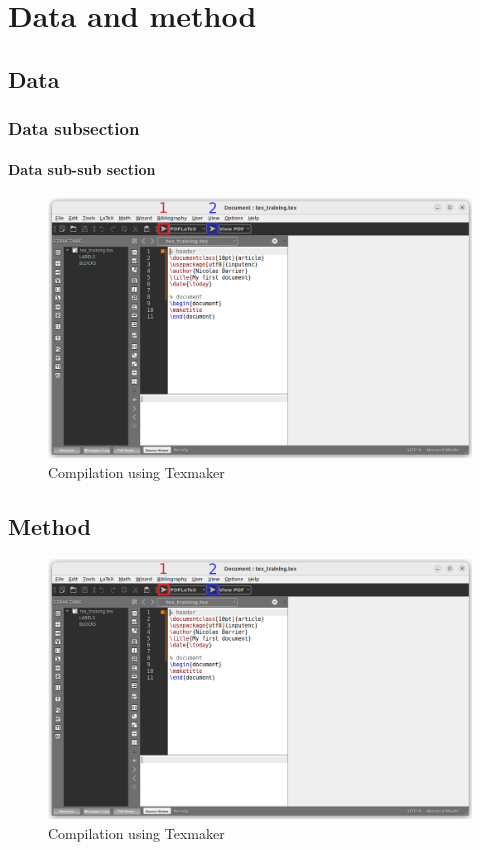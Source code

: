 \chapter{Data and method}
\label{chap:data-method}
\minitoc

\section{Data}
\subsection{Data subsection}
\subsubsection{Data sub-sub section}
\lipsum[1-3]

\begin{figure}[h!]
    \centering
    \includegraphics[width=0.5\linewidth]{figs/texmaker-1.png}
    \caption{Compilation using Texmaker}
\end{figure}

\lipsum[4-7]

\section{Method}

\lipsum[1-5]

\begin{figure}[h!]
    \centering
    \includegraphics[width=0.5\linewidth]{figs/texmaker-1.png}
    \caption{Compilation using Texmaker}
\end{figure}

\lipsum[6-7]